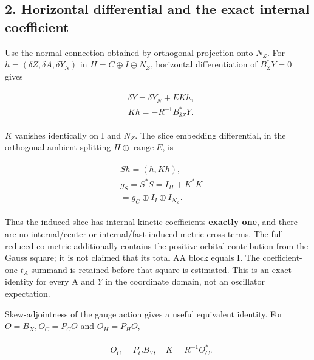 \subsection{2. Horizontal differential and the exact internal
coefficient}\label{a-horizontal-differential-and-the-exact-internal-coefficient}

Use the normal connection obtained by orthogonal projection onto
\(N_{Z}\). For \(h=(\delta  Z,\delta  A,\delta  Y_{N})\) in
\(H=C \oplus  I \oplus  N_{Z}\), horizontal differentiation of
\(B_{Z}^{*}Y=0\) gives

\begin{gather*}
\begin{aligned}
& \delta  Y=\delta  Y_{N}+E K h, \\
& K h= -R^{-1} B_{\delta  Z}^{*}Y.
\end{aligned}\tag{3}
\end{gather*}

\(K\) vanishes identically on I and \(N_{Z}\). The slice embedding
differential, in the orthogonal ambient splitting
\(H \oplus  \operatorname{range}  E\), is

\begin{gather*}
\begin{aligned}
& S h=(h,K h), \\
& g_{S}=S^{*}S=I_{H}+K^{*}K \\
& =g_{C} \oplus  I_{I} \oplus  I_{N_{Z}}.
\end{aligned}\tag{4}
\end{gather*}

Thus the induced slice has internal kinetic coefficients \textbf{exactly
one}, and there are no internal/center or internal/fast induced-metric
cross terms. The full reduced co-metric additionally contains the
positive orbital contribution from the Gauss square; it is not claimed
that its total AA block equals I. The coefficient-one \(t_{A}\) summand
is retained before that square is estimated. This is an exact identity
for every A and \(Y\) in the coordinate domain, not an oscillator
expectation.

Skew-adjointness of the gauge action gives a useful equivalent identity.
For \(O=B_{X}, O_{C}=P_{C} O\) and \(O_{H}=P_{H} O\),

\begin{gather*}
\begin{aligned}
& O_{C}=P_{C} B_{Y}, \quad  K=R^{-1} O_{C}^{*}.
\end{aligned}\tag{5}
\end{gather*}

